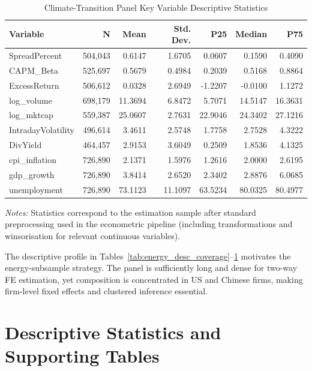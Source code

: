\documentclass{article}
\theoremstyle{plain}
\begin{document}
\begin{table}[htbp]
\centering
\caption{Climate-Transition Panel Key Variable Descriptive Statistics}
\label{tab:energy_desc_vars}
\begin{threeparttable}
\small
\setlength{\tabcolsep}{4pt}
\begin{tabular}{l r r r r r r}
\toprule
Variable & N & Mean & Std. Dev. & P25 & Median & P75 \\
\midrule
SpreadPercent & 504,043 & 0.6147 & 1.6705 & 0.0607 & 0.1590 & 0.4090 \\
CAPM\_Beta & 525,697 & 0.5679 & 0.4984 & 0.2039 & 0.5168 & 0.8864 \\
ExcessReturn & 506,612 & 0.0328 & 2.6949 & -1.2207 & -0.0100 & 1.1272 \\
log\_volume & 698,179 & 11.3694 & 6.8472 & 5.7071 & 14.5147 & 16.3631 \\
log\_mktcap & 559,387 & 25.0607 & 2.7631 & 22.9046 & 24.3402 & 27.1216 \\
IntradayVolatility & 496,614 & 3.4611 & 2.5748 & 1.7758 & 2.7528 & 4.3222 \\
DivYield & 464,457 & 2.9153 & 3.6049 & 0.2509 & 1.8536 & 4.1325 \\
cpi\_inflation & 726,890 & 2.1371 & 1.5976 & 1.2616 & 2.0000 & 2.6195 \\
gdp\_growth & 726,890 & 3.8414 & 2.6520 & 2.3402 & 2.8876 & 6.0685 \\
unemployment & 726,890 & 73.1123 & 11.1097 & 63.5234 & 80.0325 & 80.4977 \\
\bottomrule
\end{tabular}
\begin{tablenotes}\small
\item \textit{Notes:} Statistics correspond to the estimation sample after standard preprocessing used in the econometric pipeline (including transformations and winsorisation for relevant continuous variables).
\end{tablenotes}
\end{threeparttable}
\end{table}

The descriptive profile in Tables~\ref{tab:energy_desc_coverage}--\ref{tab:energy_desc_vars} motivates the energy-subsample strategy. The panel is sufficiently long and dense for two-way FE estimation, yet composition is concentrated in US and Chinese firms, making firm-level fixed effects and clustered inference essential.

\FloatBarrier
\FloatBarrier
\section{Descriptive Statistics and Supporting Tables}
\label{sec:appendix_corpus}
\end{document}
